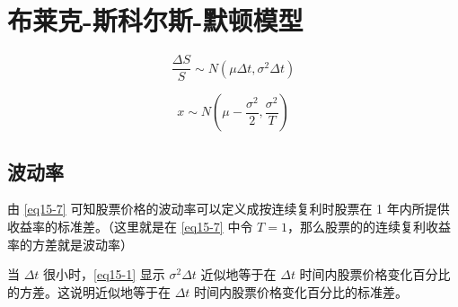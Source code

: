 \chapter{布莱克-斯科尔斯-默顿模型}

\begin{equation}
    \label{eq15-1}
    \frac{\Delta S}{S}\sim N(\mu\Delta t, \sigma^2\Delta t)
\end{equation}

\begin{equation}
    \label{eq15-7}
    x\sim N(\mu-\frac{\sigma^2}{2}, \frac{\sigma^2}{T})
\end{equation}
\section{波动率}
由 \autoref{eq15-7} 可知股票价格的波动率可以定义成按连续复利时股票在 1 年内所提供收益率的标准差。（这里就是在 \autoref{eq15-7} 中令 $T = 1$，那么股票的的连续复利收益率的方差就是波动率）

当 $\Delta t$ 很小时，\autoref{eq15-1} 显示 $\sigma^2\Delta t$ 近似地等于在 $\Delta t$ 时间内股票价格变化百分比的方差。这说明近似地等于在 $\Delta t$ 时间内股票价格变化百分比的标准差。
